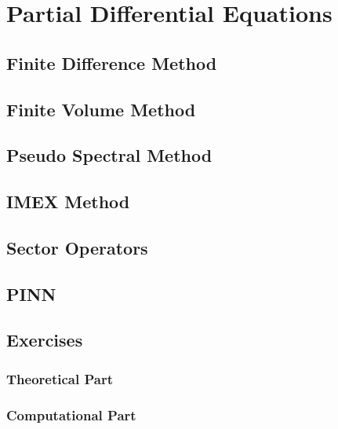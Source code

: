 \chapter{Partial Differential Equations}

\section{Finite Difference Method}


\section{Finite Volume Method}

\section{Pseudo Spectral Method}

\section{IMEX Method}

\section{Sector Operators}


\section{PINN}

\section{Exercises}
\subsection{Theoretical Part}
\subsection{Computational Part}